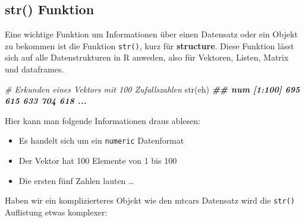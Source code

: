 \documentclass[
]{article}
\newenvironment{Shaded}{\begin{snugshade}}{\end{snugshade}}
\newcommand{\CommentTok}[1]{\textcolor[rgb]{0.56,0.35,0.01}{\textit{#1}}}
\newcommand{\DocumentationTok}[1]{\textcolor[rgb]{0.56,0.35,0.01}{\textbf{\textit{#1}}}}
\newcommand{\FunctionTok}[1]{\textcolor[rgb]{0.00,0.00,0.00}{#1}}
\newcommand{\NormalTok}[1]{#1}
\providecommand{\tightlist}{%
  \setlength{\itemsep}{0pt}\setlength{\parskip}{0pt}}
\begin{document}
\hypertarget{str-funktion}{%
\subsection{str() Funktion}\label{str-funktion}}

Eine wichtige Funktion um Informationen über einen Datensatz oder ein Objekt zu bekommen ist die Funktion \texttt{str()}, kurz für \textbf{structure}. Diese Funktion lässt sich auf alle Datenstrukturen in R anweden, also für Vektoren, Listen, Matrix und dataframes.

\begin{Shaded}
\begin{Highlighting}[]
\CommentTok{\# Erkunden eines Vektors mit 100 Zufallszahlen}
\FunctionTok{str}\NormalTok{(eh)}
\DocumentationTok{\#\#  num [1:100] 695 615 633 704 618 ...}
\end{Highlighting}
\end{Shaded}

Hier kann man folgende Informationen draus ablesen:

\begin{itemize}
\tightlist
\item
  Es handelt sich um ein \texttt{numeric} Datenformat
\item
  Der Vektor hat 100 Elemente von 1 bis 100
\item
  Die ersten fünf Zahlen lauten \ldots{}
\end{itemize}

Haben wir ein komplizierteres Objekt wie den mtcars Datensatz wird die \texttt{str()} Auflistung etwas komplexer:

\begin{Shaded}
\end{Shaded}
\end{document}

